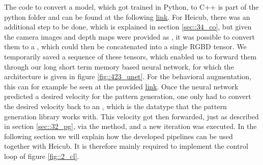 The code to convert a model, which got trained in Python, to C++ is part of the python folder and can be found at the following \href{https://github.com/mhubii/nmpc_pattern_generator/blob/master/libs/learning/python/python_to_cpp.py}{\underline{link}}. For Heicub, there was an additional step to be done, which is explained in section \ref{sec::34_co}, but given the camera images and depth maps were provided as , it was possible to convert them to a , which could then be concatenated into a single RGBD tensor. We temporarily saved a sequence of these tensors, which enabled us to forward them through our long short term memory based neural network, for which the architecture is given in figure \ref{fig::423_unet}. For the behavioral augmentation, this can for example be seen at the provided \href{https://github.com/mhubii/nmpc_pattern_generator/blob/719fde0bb73925923de85cbf379c5523e075dfeb/src/behavioural_augmentation_real_robot_external_data.cpp#L625}{\underline{link}}. Once the neural network predicted a desired velocity for the pattern generation, one only had to convert the desired velocity back to an , which is the datatype that the pattern generation library works with. This velocity got then forwarded, just as described in section \ref{sec::32_pg}, via the  method, and a new iteration was executed. In the following section we will explain how the developed pipelines can be used together with Heicub. It is therefore mainly required to implement the control loop of figure \ref{fig::2_cl}. 